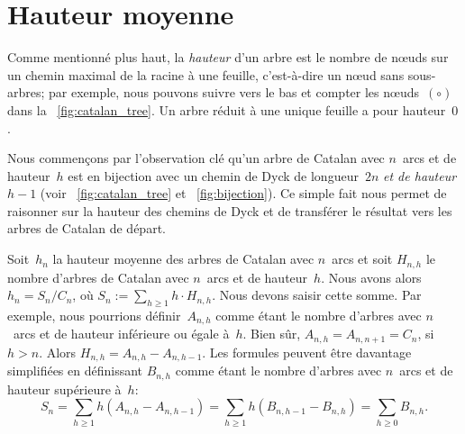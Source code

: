 \section{Hauteur moyenne}
\label{sec:Catalan_height}

Comme mentionné plus haut, la \emph{hauteur} d'un arbre est le nombre
de n{\oe}uds sur un chemin maximal de la racine à une feuille,
c'est-à-dire un n{\oe}ud sans sous-arbres; par exemple, nous pouvons
suivre vers le bas et compter les n{\oe}uds~\((\circ)\) dans la
\fig~\ref{fig:catalan_tree}. Un arbre réduit à une unique feuille a
pour hauteur~\(0\).

Nous commençons par l'observation clé qu'un arbre de Catalan avec
\(n\)~arcs et de hauteur~\(h\) est en bijection avec un chemin de Dyck
de longueur~\(2n\) \emph{et de hauteur \(h-1\)} (voir
\fig~\vref{fig:catalan_tree} et \fig~\ref{fig:bijection}). Ce simple
fait nous permet de raisonner sur la hauteur des chemins de Dyck et de
transférer le résultat vers les arbres de Catalan de départ.

Soit~\(h_n\) la hauteur moyenne des arbres de Catalan avec \(n\)~arcs
et soit \(H_{n,h}\) le nombre d'arbres de Catalan avec \(n\)~arcs et
de hauteur~\(h\). Nous avons alors \(h_n = S_n/C_{n}\), où \(S_n :=
\sum_{h \geqslant 1} h \cdot H_{n,h}\). Nous devons saisir cette
somme. Par exemple, nous pourrions définir~\(A_{n,h}\) comme étant le
nombre d'arbres avec \(n\)~arcs et de hauteur inférieure ou égale
à~\(h\). Bien sûr, \(A_{n,h} = A_{n,n+1} = C_{n}\), si \(h >
n\). Alors \(H_{n,h} = A_{n,h}-A_{n,h-1}\). Les formules peuvent être
davantage simplifiées en définissant \(B_{n,h}\) comme étant le nombre
d'arbres avec \(n\)~arcs et de hauteur supérieure à~\(h\):
\begin{equation}
S_n = \sum_{h \geqslant 1}h(A_{n,h}-A_{n,h-1})
    = \sum_{h \geqslant 1}h(B_{n,h-1}-B_{n,h}) = \sum_{h\geqslant 0} B_{n,h}.
\label{eq:Sn}
\end{equation}

